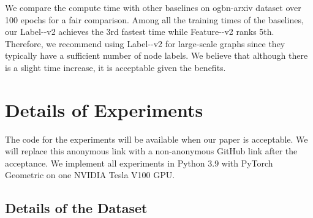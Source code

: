 We compare the compute time \ours with other baselines on ogbn-arxiv dataset over 100 epochs for a fair comparison. 
Among all the training times of the baselines, our Label-\ours-v2 achieves the 3rd fastest time while Feature-\ours-v2 ranks 5th. Therefore, we recommend using Label-\ours-v2 for large-scale graphs since they typically have a sufficient number of node labels. We believe that although there is a slight time increase, it is acceptable given the benefits.
\begin{table}[htbp]
\centering
\caption{Estimated training time of \ours on ogbn-arixv dataset. All experiments are run under 2 layers and 100 epochs. s is the abbreviation for second.}
\label{tab:my-table}
\end{table}

\section{Details of Experiments}
\label{app: exp}


% 
The code for the experiments will be available when our paper is acceptable.
We will replace this anonymous link with a non-anonymous GitHub link after the acceptance. 
We implement all experiments in Python 3.9 with PyTorch Geometric on one NVIDIA Tesla V100 GPU.

\subsection{Details of the Dataset}
\label{app: data}

